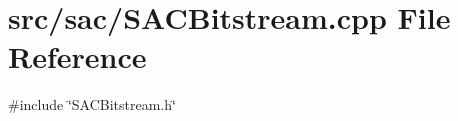 \section{src/sac/\+S\+A\+C\+Bitstream.cpp File Reference}
\label{_s_a_c_bitstream_8cpp}
{\ttfamily \#include \char`\"{}S\+A\+C\+Bitstream.\+h\char`\"{}}\newline

